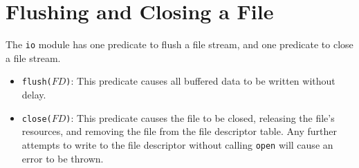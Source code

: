 \section{Flushing and Closing a File}
The \texttt{io} module has one predicate to flush a file stream, and one predicate to close a file stream.
\begin{itemize}
\item \texttt{flush($FD$)}: This predicate causes all buffered data to be written without delay.
\item \texttt{close($FD$)}: This predicate causes the file to be closed, releasing the file's resources, and removing the file from the file descriptor table.  Any further attempts to write to the file descriptor without calling \texttt{open} will cause an error to be thrown.
\end{itemize}
